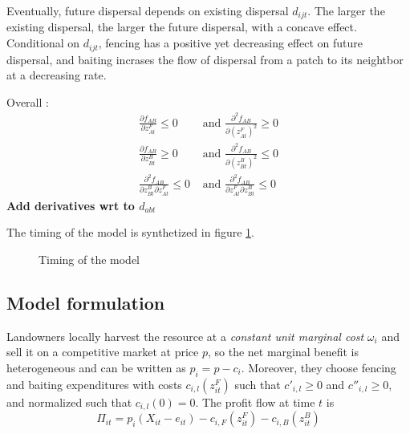 \documentclass{article}
\begin{document}
Eventually, future dispersal depends on existing dispersal $d_{ijt}$. The larger the existing dispersal, the larger the future dispersal, with a concave effect. Conditional on $d_{ijt}$, fencing has a positive yet decreasing effect on future dispersal, and baiting incrases the flow of dispersal from a patch to its neightbor at a decreasing rate. 


 Overall : 
\begin{align*}
    \frac{\partial f_{AB}}{\partial z^F_{At}}\leq 0 &\text{ and } \frac{\partial^2 f_{AB}}{\partial (z^F_{At})^2} \geq 0\\
    \frac{\partial f_{AB}}{\partial z^B_{Bt}}\geq 0 &\text{ and } \frac{\partial^2 f_{AB}}{\partial (z^B_{Bt})^2} \leq 0\\
    \frac{\partial ^2 f_{AB}}{\partial z_{Bt}^B\partial z_{At}^F} \leq 0 &\text{ and } \frac{\partial ^2 f_{AB}}{\partial z_{At}^F\partial z_{Bt}^B} \leq 0
\end{align*}
\textbf{Add derivatives wrt to $d_{abt}$}


The timing of the model is synthetized in figure \ref{fig:timing}.

\begin{figure}[H]
  \centering
  \caption{Timing of the model}
  \label{fig:timing}
\end{figure}


\subsection{Model formulation}
Landowners locally harvest the resource at a \textit{constant unit marginal cost} $\omega_i$ and sell it on a competitive market at price $p$, so the net marginal benefit is heterogeneous and can be written as $p_i = p - c_i$. Moreover, they choose fencing and baiting expenditures with costs $c_{i,l}(z_{it}^F)$ such that $c'_{i,l}\geq 0$ and $c''_{i,l} \geq 0$, and normalized such that $c_{i,l}(0) = 0$. The profit flow at time $t$ is
\begin{equation}
    \Pi_{it} = p_i(X_{it} - e_{it}) - c_{i,F}(z_{it}^F) - c_{i,B}(z_{it}^B)
\end{equation}
\end{document}
